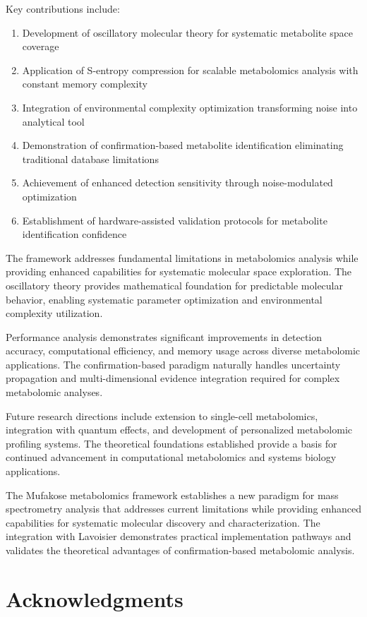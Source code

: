 \documentclass[12pt,a4paper]{article}
\begin{document}
Key contributions include:

\begin{enumerate}
\item Development of oscillatory molecular theory for systematic metabolite space coverage
\item Application of S-entropy compression for scalable metabolomics analysis with constant memory complexity
\item Integration of environmental complexity optimization transforming noise into analytical tool
\item Demonstration of confirmation-based metabolite identification eliminating traditional database limitations
\item Achievement of enhanced detection sensitivity through noise-modulated optimization
\item Establishment of hardware-assisted validation protocols for metabolite identification confidence
\end{enumerate}

The framework addresses fundamental limitations in metabolomics analysis while providing enhanced capabilities for systematic molecular space exploration. The oscillatory theory provides mathematical foundation for predictable molecular behavior, enabling systematic parameter optimization and environmental complexity utilization.

Performance analysis demonstrates significant improvements in detection accuracy, computational efficiency, and memory usage across diverse metabolomic applications. The confirmation-based paradigm naturally handles uncertainty propagation and multi-dimensional evidence integration required for complex metabolomic analyses.

Future research directions include extension to single-cell metabolomics, integration with quantum effects, and development of personalized metabolomic profiling systems. The theoretical foundations established provide a basis for continued advancement in computational metabolomics and systems biology applications.

The Mufakose metabolomics framework establishes a new paradigm for mass spectrometry analysis that addresses current limitations while providing enhanced capabilities for systematic molecular discovery and characterization. The integration with Lavoisier demonstrates practical implementation pathways and validates the theoretical advantages of confirmation-based metabolomic analysis.

\section{Acknowledgments}
\end{document}

